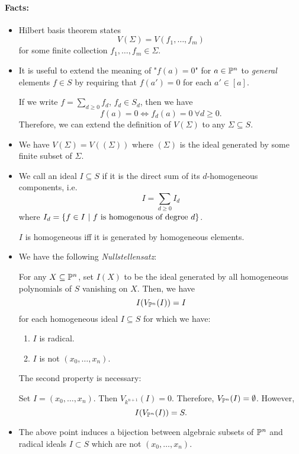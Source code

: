 \paragraph{Facts:}
\begin{itemize}
	\item Hilbert basis theorem states
	\[ V(\Sigma) = V(f_1, \ldots, f_m) \]
	for some finite collection $f_1,\ldots, f_m \in \Sigma$.
	\item It is useful to extend the meaning of "$f(a) = 0$" for $a \in \P^n$ to \emph{general} elements $f \in S$ by requiring that $f(a') = 0$ for each $a' \in [a]$.
	
	If we write $f = \sum_{d \geq 0} f_d$, $f_d \in S_d$, then we have
	\[ f(a) = 0 \iff f_d(a) = 0 ~ \forall d \geq 0. \]
	Therefore, we can extend the definition of $V(\Sigma)$ to any $\Sigma \subseteq S$.
	\item We have $V(\Sigma) = V((\Sigma))$ where $(\Sigma)$ is the ideal generated by some finite subset of $\Sigma$.
	\item We call an ideal $I \subseteq S$  if it is the direct sum of its $d$-homogeneous components, i.e.
	\[ I = \sum_{d \geq 0}I_d \]
	where $I_d = \set{f \in I}{f \text{ is homogenous of degree }d}$.
	
	$I$ is homogeneous iff it is generated by homogeneous elements.
	\item We have the following \emph{Nullstellensatz}:
	
	For any $X \subseteq \P^n$, set $I(X)$ to be the ideal generated by all homogeneous polynomials of $S$ vanishing on $X$. Then, we have
	\[ I(V_{\P^n}(I)) = I \]
	for each homogeneous ideal $I \subseteq S$ for which we have:
	\begin{enumerate}
		\item $I$ is radical.
		\item $I$ is not $(x_0, \ldots, x_n)$.
	\end{enumerate}
\begin{example}
	The second property is necessary:
	
Set $I = (x_0, \ldots, x_n)$. Then $V_{k^{n+1}}(I) = 0$. Therefore, $V_{\P^n}(I) = \emptyset$. However,
\[ I(V_{\P^n}(I)) = S. \]
\end{example}
\item The above point induces a bijection between algebraic subsets of $\P^n$ and radical ideals $I \subset S$ which are not $(x_0,\ldots, x_n)$.
\end{itemize}

